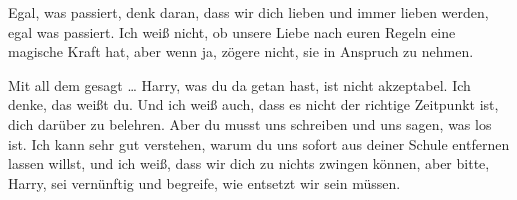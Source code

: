\begin{writtenNote}
Egal, was passiert, denk daran, dass wir dich lieben und immer lieben werden, egal was passiert. Ich weiß nicht, ob unsere Liebe nach euren Regeln eine magische Kraft hat, aber wenn ja, zögere nicht, sie in Anspruch zu nehmen.

Mit all dem gesagt … Harry, was du da getan hast, ist nicht akzeptabel. Ich denke, das weißt du. Und ich weiß auch, dass es nicht der richtige Zeitpunkt ist, dich darüber zu belehren. Aber du musst uns schreiben und uns sagen, was los ist. Ich kann sehr gut verstehen, warum du uns sofort aus deiner Schule entfernen lassen willst, und ich weiß, dass wir dich zu nichts zwingen können, aber bitte, Harry, sei vernünftig und begreife, wie entsetzt wir sein müssen.


\end{writtenNote}
